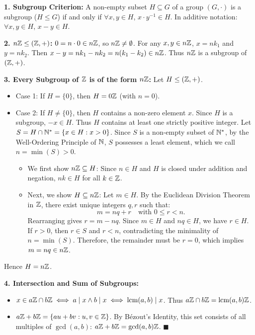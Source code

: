 \begin{solution}
\textbf{1. Subgroup Criterion:}
A non-empty subset $H \subseteq G$ of a group $(G, \cdot)$ is a subgroup ($H \le G$) if and only if $\forall x, y \in H$, $x \cdot y^{-1} \in H$. In additive notation: $\forall x, y \in H$, $x - y \in H$.

\textbf{2. $n\mathbb{Z} \le (\mathbb{Z}, +)$:}
$0 = n \cdot 0 \in n\mathbb{Z}$, so $n\mathbb{Z} \ne \emptyset$.
For any $x, y \in n\mathbb{Z}$, $x = nk_1$ and $y = nk_2$.
Then $x - y = nk_1 - nk_2 = n(k_1 - k_2) \in n\mathbb{Z}$.
Thus $n\mathbb{Z}$ is a subgroup of $(\mathbb{Z}, +)$.

\textbf{3. Every Subgroup of $\mathbb{Z}$ is of the form $n\mathbb{Z}$:}
Let $H \le (\mathbb{Z}, +)$.
\begin{itemize}[leftmargin=1.5em,itemsep=2pt]
  \item Case 1: If $H = \{0\}$, then $H = 0\mathbb{Z}$ (with $n = 0$).
  \item Case 2: If $H \ne \{0\}$, then $H$ contains a non-zero element $x$. Since $H$ is a subgroup, $-x \in H$. Thus $H$ contains at least one strictly positive integer.
  Let $S = H \cap \mathbb{N}^* = \{x \in H : x > 0\}$. Since $S$ is a non-empty subset of $\mathbb{N}^*$, by the Well-Ordering Principle of $\mathbb{N}$, $S$ possesses a least element, which we call $n = \min(S) > 0$.
  \begin{itemize}[leftmargin=1.2em,itemsep=1pt]
    \item We first show $n\mathbb{Z} \subseteq H$: Since $n \in H$ and $H$ is closed under addition and negation, $nk \in H$ for all $k \in \mathbb{Z}$.
    \item Next, we show $H \subseteq n\mathbb{Z}$: Let $m \in H$. By the Euclidean Division Theorem in $\mathbb{Z}$, there exist unique integers $q, r$ such that:
    \[
    m = nq + r \quad \text{with } 0 \le r < n.
    \]
    Rearranging gives $r = m - nq$. Since $m \in H$ and $nq \in H$, we have $r \in H$.
    If $r > 0$, then $r \in S$ and $r < n$, contradicting the minimality of $n = \min(S)$.
    Therefore, the remainder must be $r = 0$, which implies $m = nq \in n\mathbb{Z}$.
  \end{itemize}
\end{itemize}
Hence $H = n\mathbb{Z}$.

\textbf{4. Intersection and Sum of Subgroups:}
\begin{itemize}[leftmargin=1.5em,itemsep=1pt]
  \item $x \in a\mathbb{Z} \cap b\mathbb{Z} \iff a \mid x \land b \mid x \iff \operatorname{lcm}(a, b) \mid x$. Thus $a\mathbb{Z} \cap b\mathbb{Z} = \operatorname{lcm}(a, b)\mathbb{Z}$.
  \item $a\mathbb{Z} + b\mathbb{Z} = \{au + bv : u, v \in \mathbb{Z}\}$. By Bézout's Identity, this set consists of all multiples of $\gcd(a, b)$: $a\mathbb{Z} + b\mathbb{Z} = \gcd(a, b)\mathbb{Z}$. \hfill $\blacksquare$
\end{itemize}
\end{solution}

